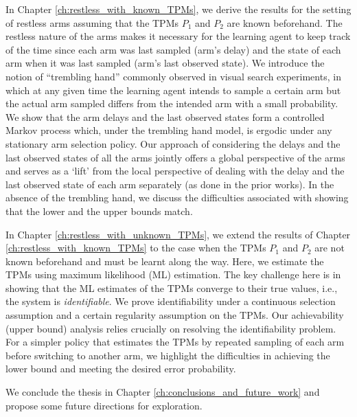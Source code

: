 In Chapter \ref{ch:restless_with_known_TPMs}, we derive the results for the setting of restless arms assuming that the TPMs $P_1$ and $P_2$ are known beforehand. The restless nature of the arms makes it necessary for the learning agent to keep track of the time since each arm was last sampled (arm's delay) and the state of each arm when it was last sampled (arm's last observed state). We introduce the notion of ``trembling hand'' commonly observed in visual search experiments, in which at any given time the learning agent intends to sample a certain arm but the actual arm sampled differs from the intended arm with a small probability. We show that the arm delays and the last observed states form a controlled Markov process which, under the trembling hand model, is ergodic under any stationary arm selection policy. Our approach of considering the delays and the last observed states of all the arms jointly offers a global perspective of the arms and serves as a `lift' from the local perspective of dealing with the delay and the last observed state of each arm separately (as done in the prior works). In the absence of the trembling hand, we discuss the difficulties associated with showing that the lower and the upper bounds match.

In Chapter \ref{ch:restless_with_unknown_TPMs}, we extend the results of Chapter \ref{ch:restless_with_known_TPMs} to the case when the TPMs $P_1$ and $P_2$ are not known beforehand and must be learnt along the way. Here, we estimate the TPMs using maximum likelihood (ML) estimation. The key challenge here is in showing that the ML estimates of the TPMs converge to their true values, i.e., the system is {\em identifiable}. We prove identifiability under a continuous selection assumption and a certain regularity assumption on the TPMs. Our achievability (upper bound) analysis relies crucially on resolving the identifiability problem. For a simpler policy that estimates the TPMs by repeated sampling of each arm before switching to another arm, we highlight the difficulties  in achieving the lower bound and meeting the desired error probability.

We conclude the thesis in Chapter \ref{ch:conclusions_and_future_work} and propose some future directions for exploration.


